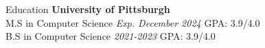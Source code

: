 \begin{rSection}{Education}
    {\bf University of Pittsburgh}\\
    M.S in Computer Science
    \hfill
    {\em Exp. December 2024}
    GPA: 3.9/4.0
    \\
    B.S in Computer Science
    \hfill
    {\em 2021-2023}
    GPA: 3.9/4.0
    
\end{rSection}
